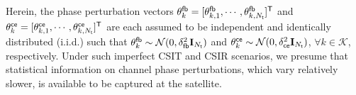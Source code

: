\documentclass[draftclsnofoot, onecolumn, comsoc, 12pt]{IEEEtran}
\begin{document}
Herein, the phase perturbation vectors $\mathbf{\theta}_{k}^{\sf{fb}} = [\theta_{k,1}^{\sf{fb}}, \cdots, \theta_{k, N_{{\sf{t}}}}^{\sf{fb}}]^{\sf{T}}$ and $\mathbf{\theta}_{k}^{\sf{ce}} = [\theta_{k,1}^{\sf{ce}}, \cdots, \theta_{k, N_{{\sf{t}}}}^{\sf{ce}}]^{\sf{T}}$ are each assumed to be independent and identically distributed (i.i.d.) such that $\mathbf{\theta}_{k}^{\sf{fb}}\sim\mathcal{N}{(0,\delta_{\sf{fb}}^{2}\mathbf{I}_{N_{{\sf{t}}}})}$ and $\mathbf{\theta}_{k}^{\sf{ce}}\sim\mathcal{N}{(0,\delta_{\sf{ce}}^{2}\mathbf{I}_{N_{{\sf{t}}}})}$, $\forall k \in \mathcal{K}$, respectively. 
Under such imperfect CSIT and CSIR scenarios, we presume that statistical information on channel phase perturbations, which vary relatively slower, is available to be captured at the satellite.




\end{document}
